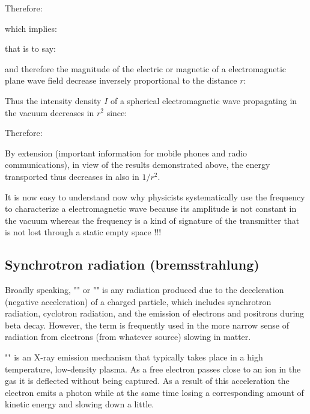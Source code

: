	Therefore:
	
	which implies:
	
	that is to say:
	
	and therefore the magnitude of the electric or magnetic of a electromagnetic plane wave field decrease inversely proportional to the distance $r$:
	
	Thus the intensity density $I$ of a spherical electromagnetic wave propagating in the vacuum decreases in $r^2$ since:
	
	Therefore:
	
	By extension (important information for mobile phones and radio communications), in view of the results demonstrated above, the energy transported thus decreases in also in $1/r^2$.
	
	It is now easy to understand now why physicists systematically use the frequency to characterize a electromagnetic wave because its amplitude is not constant in the vacuum whereas the frequency is a kind of signature of the transmitter that is not lost through a static empty space !!!
	
	\pagebreak
	\subsection{Synchrotron radiation (bremsstrahlung)}\label{bremsstrahlung}
	Broadly speaking, "" or "" is any radiation produced due to the deceleration (negative acceleration) of a charged particle, which includes synchrotron radiation, cyclotron radiation, and the emission of electrons and positrons during beta decay. However, the term is frequently used in the more narrow sense of radiation from electrons (from whatever source) slowing in matter. 
	
	\begin{tcolorbox}[title=Remark,colframe=black,arc=10pt]
	"" is an X-ray emission mechanism that typically takes place in a high temperature, low-density plasma. As a free electron passes close to an ion in the gas it is deflected without being captured. As a result of this acceleration the electron emits a photon while at the same time losing a corresponding amount of kinetic energy and slowing down a little.
	\end{tcolorbox}
	
